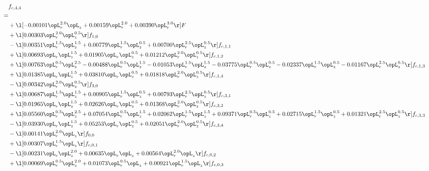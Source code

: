 \begin{alignat}{2} 
\label{eq:f_44_1} 
& f_{c,4,4} \nonumber \\ 
 = \\ 
& + \l[  -0.00101 \opL_r^{2.0} \opL_z +  0.00159 \opL_r^{2.0} +  0.00390 \opL_r^{3.0}  \r] F \nonumber \\ 
& + \l[  0.00303 \opL_r^{2.0} \opL_z^{0.5}  \r] f_{1,0} \nonumber \\ 
& - \l[  0.00351 \opL_r^{1.5} \opL_z^{1.5} +  0.00779 \opL_r^{1.5} \opL_z^{0.5} +  0.00700 \opL_r^{2.5} \opL_z^{0.5}  \r] f_{c,1,1} \nonumber \\ 
& + \l[  0.00693 \opL_r \opL_z^{1.5} +  0.01905 \opL_r \opL_z^{0.5} +  0.01212 \opL_r^{2.0} \opL_z^{0.5}  \r] f_{c,1,2} \nonumber \\ 
& + \l[  0.00763 \opL_r^{0.5} \opL_z^{2.5}   -0.00488 \opL_r^{0.5} \opL_z^{1.5}   -0.01053 \opL_r^{1.5} \opL_z^{1.5}   -0.03775 \opL_r^{0.5} \opL_z^{0.5}   -0.02337 \opL_r^{1.5} \opL_z^{0.5}   -0.01167 \opL_r^{2.5} \opL_z^{0.5}  \r] f_{c,1,3} \nonumber \\ 
& + \l[  0.01385 \opL_r \opL_z^{1.5} +  0.03810 \opL_r \opL_z^{0.5} +  0.01818 \opL_r^{2.0} \opL_z^{0.5}  \r] f_{c,1,4} \nonumber \\ 
& - \l[  0.00342 \opL_r^{2.0} \opL_z^{0.5}  \r] f_{3,0} \nonumber \\ 
& + \l[  0.00687 \opL_r^{1.5} \opL_z^{1.5} +  0.00905 \opL_r^{1.5} \opL_z^{0.5} +  0.00793 \opL_r^{2.5} \opL_z^{0.5}  \r] f_{c,3,1} \nonumber \\ 
& - \l[  0.01965 \opL_r \opL_z^{1.5} +  0.02626 \opL_r \opL_z^{0.5} +  0.01368 \opL_r^{2.0} \opL_z^{0.5}  \r] f_{c,3,2} \nonumber \\ 
& + \l[  0.05560 \opL_r^{0.5} \opL_z^{2.5} +  0.07054 \opL_r^{0.5} \opL_z^{1.5} +  0.02062 \opL_r^{1.5} \opL_z^{1.5} +  0.09371 \opL_r^{0.5} \opL_z^{0.5} +  0.02715 \opL_r^{1.5} \opL_z^{0.5} +  0.01321 \opL_r^{2.5} \opL_z^{0.5}  \r] f_{c,3,3} \nonumber \\ 
& - \l[  0.03930 \opL_r \opL_z^{1.5} +  0.05253 \opL_r \opL_z^{0.5} +  0.02051 \opL_r^{2.0} \opL_z^{0.5}  \r] f_{c,3,4} \nonumber \\ 
& - \l[  0.00141 \opL_r^{2.0} \opL_z  \r] f_{0,0} \nonumber \\ 
& + \l[  0.00307 \opL_r^{1.5} \opL_z  \r] f_{c,0,1} \nonumber \\ 
& - \l[  0.00231 \opL_r \opL_z^{2.0} +  0.00635 \opL_r \opL_z +  0.00564 \opL_r^{2.0} \opL_z  \r] f_{c,0,2} \nonumber \\ 
& + \l[  0.00069 \opL_r^{0.5} \opL_z^{2.0} +  0.01073 \opL_r^{0.5} \opL_z +  0.00921 \opL_r^{1.5} \opL_z  \r] f_{c,0,3} \nonumber \\ 

\end{alignat}

